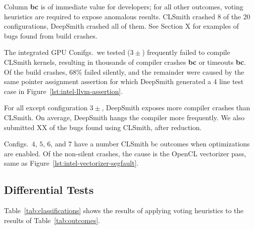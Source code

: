 Column \textbf{bc} is of immediate value for developers; for all other outcomes, voting heuristics are required to expose anomalous results. CLSmith crashed 8 of the 20 configurations, DeepSmith crashed all of them. See Section X for examples of bugs found from build crashes.

The integrated GPU Conifgs.\ we tested ($3\pm$) frequently failed to compile CLSmith kernels, resulting in thousands of compiler crashes \textbf{bc} or timeouts \textbf{bc}. 
Of the build crashes, 68\% failed silently, and the remainder were caused by the same pointer assignment assertion for which DeepSmith generated a 4 line test case in Figure~\ref{lst:intel-llvm-assertion}. 

For all except configuration $3\pm$, DeepSmith exposes more compiler crashes than CLSmith. On average, DeepSmith hangs the compiler more frequently. We also submitted XX of the bugs found using CLSmith, after reduction.

Configs.\ $4$, $5$, $6$, and $7$ have a number CLSmith bc outcomes when optimizations are enabled. Of the non-silent crashes, the cause is the OpenCL vectorizer pass, same as Figure~\ref{lst:intel-vectorizer-segfault}.




\subsection{Differential Tests}

Table~\ref{tab:classifications} shows the results of applying voting heuristics to the results of Table~\ref{tab:outcomes}.

